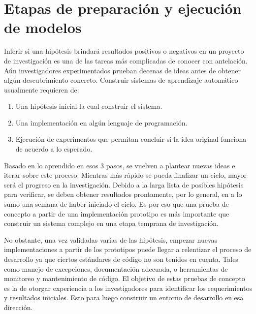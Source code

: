 \chapter{Etapas de preparación y ejecución de modelos}
\label{ch:method}

Inferir si una hipótesis brindará resultados positivos o negativos en un proyecto de investigación
es una de las tareas más complicadas de conocer con antelación. Aún investigadores experimentados prueban decenas de ideas antes de obtener algún descubrimiento concreto. Construir sistemas de aprendizaje automático usualmente requieren de:

\begin{enumerate}
    \item Una hipótesis inicial la cual construir el sistema.
    \item Una implementación en algún lenguaje de programación.
    \item Ejecución de experimentos que permitan concluir si la idea original funciona de acuerdo a lo esperado.
\end{enumerate}

Basado en lo aprendido en esos 3 pasos, se vuelven a plantear nuevas ideas e iterar sobre este proceso. Mientras más rápido se pueda finalizar un ciclo, mayor será el progreso en la investigación. Debido
a la larga lista de posibles hipótesis para verificar, se deben obtener resultados prontamente, por lo general, en a lo sumo una semana de haber iniciado el ciclo. Es por eso que una prueba de concepto a partir de una implementación prototipo es más importante que construir un sistema complejo en una etapa temprana de investigación.

No obstante, una vez validadas varias de las hipótesis, empezar nuevas implementaciones a partir de los prototipos puede llegar a relentizar el proceso de desarrollo ya que ciertos estándares de código no son tenidos en cuenta. Tales como manejo de excepciones, documentación adecuada, o herramientas de monitoreo y mantenimiento de código. El objetivo de estas pruebas de concepto es la de otorgar experiencia a los investigadores para identificar los requerimientos y resultados iniciales. Esto para luego construir un entorno de desarrollo en esa dirección.

